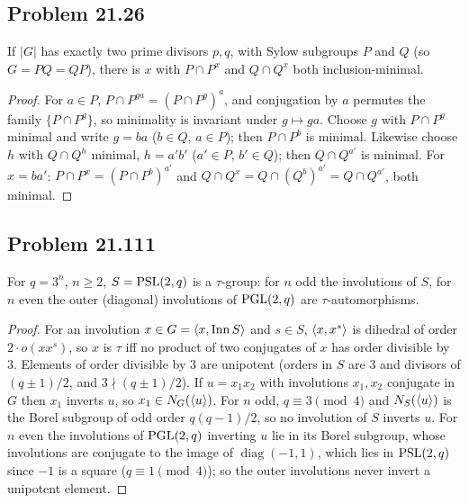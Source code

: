 \subsection{Problem 21.26}\label{app:2126}
\begin{proposition}
If $|G|$ has exactly two prime divisors $p,q$, with Sylow subgroups $P$ and $Q$ (so $G=PQ=QP$), there is
$x$ with $P\cap P^x$ and $Q\cap Q^x$ both inclusion-minimal.
\end{proposition}
\begin{proof}
For $a\in P$, $P\cap P^{ga}=(P\cap P^g)^a$, and conjugation by $a$ permutes the family $\{P\cap P^g\}$, so minimality
is invariant under $g\mapsto ga$. Choose $g$ with $P\cap P^g$ minimal and write $g=ba$ ($b\in Q$, $a\in P$); then
$P\cap P^b$ is minimal. Likewise choose $h$ with $Q\cap Q^h$ minimal, $h=a'b'$ ($a'\in P$, $b'\in Q$); then
$Q\cap Q^{a'}$ is minimal. For $x=ba'$: $P\cap P^x=(P\cap P^b)^{a'}$ and $Q\cap Q^x=Q\cap(Q^b)^{a'}=Q\cap Q^{a'}$,
both minimal.
\end{proof}

\subsection{Problem 21.111}\label{app:21111}
\begin{theorem}
For $q=3^n$, $n\ge 2$, $S=\mathrm{PSL}(2,q)$ is a $\tau$-group: for $n$ odd the involutions of $S$, for $n$ even the outer
(diagonal) involutions of $\mathrm{PGL}(2,q)$ are $\tau$-automorphisms.
\end{theorem}
\begin{proof}
For an involution $x\in G=\langle x,\operatorname{Inn} S\rangle$ and $s\in S$, $\langle x,x^s\rangle$ is dihedral of order $2\cdot o(xx^s)$, so $x$
is $\tau$ iff no product of two conjugates of $x$ has order divisible by 3. Elements of order divisible by 3 are
unipotent (orders in $S$ are 3 and divisors of $(q\pm1)/2$, and $3\nmid(q\pm1)/2$). If $u=x_1x_2$ with involutions
$x_1,x_2$ conjugate in $G$ then $x_1$ inverts $u$, so $x_1\in N_G(\langle u\rangle)$. For $n$ odd, $q\equiv 3\pmod 4$ and
$N_S(\langle u\rangle)$ is the Borel subgroup of odd order $q(q-1)/2$, so no involution of $S$ inverts $u$. For $n$ even the
involutions of $\mathrm{PGL}(2,q)$ inverting $u$ lie in its Borel subgroup, whose involutions are conjugate to the image of
$\operatorname{diag}(-1,1)$, which lies in $\mathrm{PSL}(2,q)$ since $-1$ is a square ($q\equiv 1\pmod 4$); so the outer
involutions never invert a unipotent element.
\end{proof}
